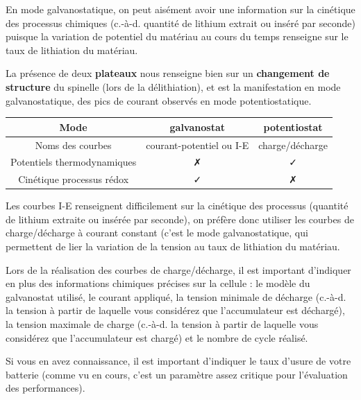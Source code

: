 \documentclass[twoside,a4paper,11pt,addpoints]{exam}%
\begin{document}
En mode galvanostatique, on peut aisément avoir une information sur la cinétique des processus chimiques (c.-à-d. quantité de lithium extrait ou inséré par seconde) puisque la variation de potentiel du matériau au cours du temps renseigne sur le taux de lithiation du matériau.

La présence de deux \textbf{plateaux} nous renseigne bien sur un \textbf{changement de structure} du spinelle (lors de la délithiation), et est la manifestation en mode galvanostatique, des pics de courant observés en mode potentiostatique.

\begin{center}
\begin{tabular}{ccc}
\toprule
Mode & galvanostat & potentiostat \\
\midrule
Noms des courbes & courant-potentiel ou I-E & charge/décharge \\ 
Potentiels thermodynamiques & \faClose & \faCheck \\
Cinétique processus rédox & \faCheck & \faClose \\
\bottomrule
\end{tabular}
\end{center}

Les courbes I-E renseignent difficilement sur la cinétique des processus (quantité de lithium extraite ou insérée par seconde), on préfère donc utiliser les courbes de charge/décharge à courant constant (c'est le mode galvanostatique, qui permettent de lier la variation de la tension au taux de lithiation du matériau.

Lors de la réalisation des courbes de charge/décharge, il est important d'indiquer en plus des informations chimiques précises sur la cellule : le modèle du galvanostat utilisé, le courant appliqué, la tension minimale de décharge (c.-à-d. la tension à partir de laquelle vous considérez que l'accumulateur est déchargé), la tension maximale de charge (c.-à-d. la tension à partir de laquelle vous considérez que l'accumulateur est chargé) et le nombre de cycle réalisé.

Si vous en avez connaissance, il est important d'indiquer le taux d'usure de votre batterie (comme vu en cours, c'est un paramètre assez critique pour l'évaluation des performances).

\end{document}
